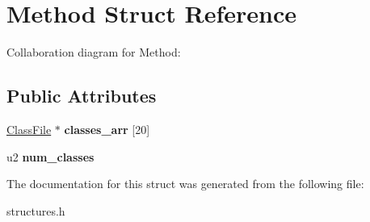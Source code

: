 \hypertarget{structMethod}{}\section{Method Struct Reference}
\label{structMethod}


Collaboration diagram for Method\+:
\subsection*{Public Attributes}
\begin{DoxyCompactItemize}
\item 
\hyperlink{structClassFile}{Class\+File} $\ast$ {\bfseries classes\+\_\+arr} \mbox{[}20\mbox{]}\hypertarget{structMethod_ace741cd234df7db5849ee2af75870b8c}{}\label{structMethod_ace741cd234df7db5849ee2af75870b8c}

\item 
u2 {\bfseries num\+\_\+classes}\hypertarget{structMethod_a40dccf4ca5a8d3a74798917a888be720}{}\label{structMethod_a40dccf4ca5a8d3a74798917a888be720}

\end{DoxyCompactItemize}


The documentation for this struct was generated from the following file\+:\begin{DoxyCompactItemize}
\item 
structures.\+h\end{DoxyCompactItemize}
